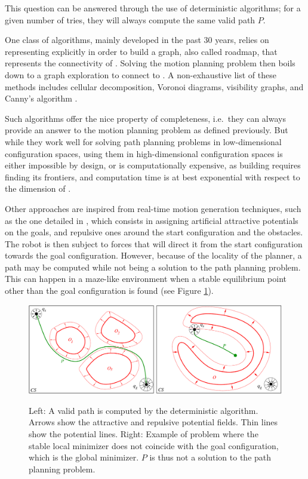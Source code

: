 This question can be answered through the use of deterministic
algorithms; for a given number of tries, they will always compute the
same valid path $P$.

One class of algorithms, mainly developed in the past 30 years, relies
on representing {\cobs} explicitly in order to build a graph, also
called roadmap, that represents the connectivity of {\cfree}. Solving
the motion planning problem then boils down to a graph exploration to
connect  to . A non-exhaustive list of these
methods includes cellular decomposition, Voronoi diagrams, visibility
graphs, and Canny's algorithm \cite{good04}.

Such algorithms offer the nice property of completeness, i.e.\ they can
always provide an answer to the motion planning problem as defined
previously. But while they work well for solving path planning
problems in low-dimensional configuration spaces, using them in
high-dimensional configuration spaces is either impossible by design,
or is computationally expensive, as building {\cfree} requires finding
its frontiers, and computation time is at best exponential with
respect to the dimension of {\cspace}.

Other approaches are inspired from real-time motion generation
techniques, such as the one detailed in \cite{khat85}, which consists
in assigning artificial attractive potentials on the goals, and
repulsive ones around the start configuration and the obstacles. The
robot is then subject to forces that will direct it from the start
configuration towards the goal configuration. However, because of the
locality of the planner, a path may be computed while not being a
solution to the path planning problem. This can happen in a maze-like
environment when a stable equilibrium point other than the goal
configuration is found (see Figure
\ref{fig:chap1-deterministic-algorithm}).

\begin{figure}
  \centering
      {\includegraphics[width = \linewidth]
        {src/chap1-path-optimization/deterministic-algorithm.pdf}}
      \caption[Motion planning with deterministic algorithms.]{Left: A
        valid path is computed by the deterministic algorithm. Arrows
        show the attractive and repulsive potential fields. Thin lines
        show the potential lines. Right: Example of problem where the
        stable local minimizer does not coincide with the goal
        configuration, which is the global minimizer. $P$ is thus not
        a solution to the path planning problem.}
      \label{fig:chap1-deterministic-algorithm}
\end{figure}

